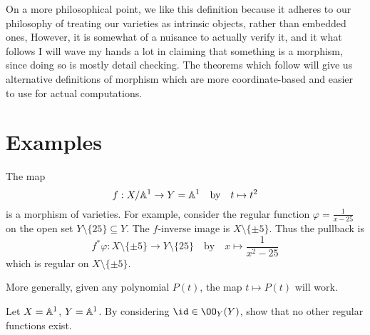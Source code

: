 \documentclass[11pt]{scrreprt}
\begin{document}
On a more philosophical point, we like this definition because
it adheres to our philosophy of treating our
varieties as intrinsic objects, rather than embedded ones,
However, it is somewhat of a nuisance to actually verify it,
and it what follows I will wave my hands a lot in claiming
that something is a morphism, since doing so is mostly detail checking.
The theorems which follow will give us alternative definitions
of morphism which are more coordinate-based
and easier to use for actual computations.

\section{Examples}
\begin{example}
	The map 
	\[ f : X / \mathbb A^1 \to Y = \mathbb A^1 \quad\text{by}\quad t \mapsto t^2 \]
	is a morphism of varieties.
	For example, consider the regular function $\varphi = \frac{1}{x-25}$ on
	the open set $Y \setminus \{25\} \subseteq Y$.
	The $f$-inverse image is $X \setminus \{\pm5\}$.
	Thus the pullback is
	\[ f^\ast\varphi : X \setminus \{\pm5\} \to Y \setminus \{25\}
		\quad\text{by}\quad x \mapsto \frac{1}{x^2-25} \]
	which is regular on $X \setminus \{\pm5\}$.

	More generally, given any polynomial $P(t)$,
	the map $t \mapsto P(t)$ will work.
\end{example}
\begin{exercise}
	Let $X = \mathbb A^1$, $Y = \mathbb A^1$.
	By considering $\id \in \OO_Y(Y)$, show that no other
	regular functions exist.
\end{exercise}
\end{document}
